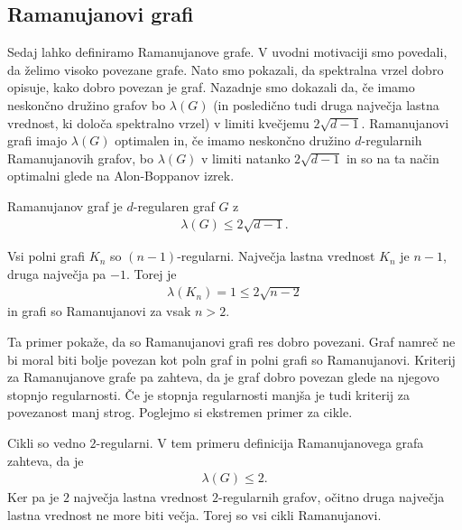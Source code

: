 \subsection{Ramanujanovi grafi}
Sedaj lahko definiramo Ramanujanove grafe. V uvodni motivaciji smo povedali, da želimo visoko povezane grafe. Nato smo pokazali, da spektralna vrzel dobro opisuje, kako dobro povezan je graf. Nazadnje smo dokazali da, če imamo neskončno družino grafov bo \(\lambda(G)\) (in posledično tudi druga največja lastna vrednost, ki določa spektralno vrzel) v limiti kvečjemu \(2\sqrt{d-1}\). Ramanujanovi grafi imajo \(\lambda(G)\) optimalen in, če imamo neskončno družino \(d\)-regularnih Ramanujanovih grafov, bo \(\lambda(G)\) v limiti natanko \(2\sqrt{d-1}\) in so na ta način optimalni glede na Alon-Boppanov izrek.

\begin{definicija}
    Ramanujanov graf je \(d\)-regularen graf \(G\) z
    \begin{align*}
        \lambda(G) \leq 2\sqrt{d-1}.
    \end{align*}
\end{definicija}

\begin{primer}
    Vsi polni grafi \(K_n\) so \((n-1)\)-regularni. Največja lastna vrednost \(K_n\) je \(n-1\), druga največja pa \(-1\). Torej je
    \begin{align*}
        \lambda(K_n) = 1 \leq 2\sqrt{n-2}
    \end{align*}
    in grafi so Ramanujanovi za vsak \(n>2\).
\end{primer}
Ta primer pokaže, da so Ramanujanovi grafi res dobro povezani. Graf namreč ne bi moral biti bolje povezan kot poln graf in polni grafi so Ramanujanovi. Kriterij za Ramanujanove grafe pa zahteva, da je graf dobro povezan glede na njegovo stopnjo regularnosti. Če je stopnja regularnosti manjša je tudi kriterij za povezanost manj strog. Poglejmo si ekstremen primer za cikle.
\begin{primer}[Cikli]
    Cikli so vedno \(2\)-regularni. V tem primeru definicija Ramanujanovega grafa zahteva, da je
    \begin{align*}
        \lambda(G) \leq 2.
    \end{align*}
    Ker pa je \(2\) največja lastna vrednost \(2\)-regularnih grafov, očitno druga največja lastna vrednost ne more biti večja. Torej so vsi cikli Ramanujanovi.
\end{primer}

